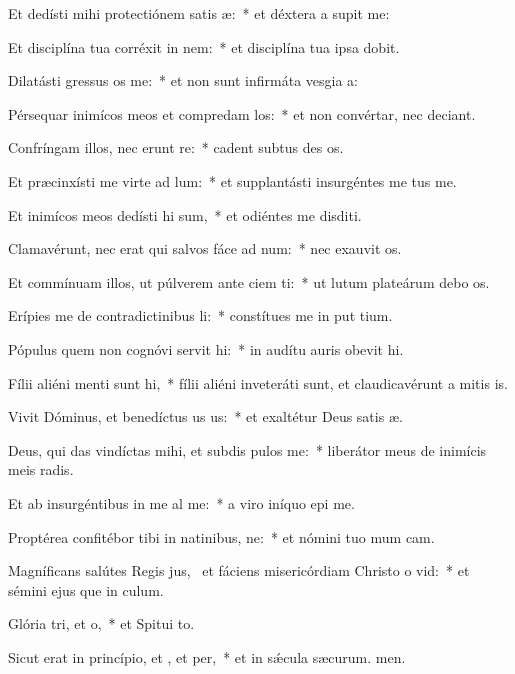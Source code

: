 \item Et dedísti mihi protectiónem satis æ:~* et déxtera a supit me:
\item Et disciplína tua corréxit  in nem:~* et disciplína tua ipsa  dobit.
\item Dilatásti gressus os  me:~* et non sunt infirmáta vesgia a:
\item Pérsequar inimícos meos et compredam los:~* et non convértar, nec deciant.
\item Confríngam illos, nec erunt re:~* cadent subtus des os.
\item Et præcinxísti me virte ad lum:~* et supplantásti insurgéntes  me tus me.
\item Et inimícos meos dedísti hi sum,~* et odiéntes me disditi.
\item Clamavérunt, nec erat qui salvos fáce ad num:~* nec exauvit os.
\item Et commínuam illos, ut púlverem ante ciem ti:~* ut lutum plateárum debo os.
\item Erípies me de contradictinibus li:~* constítues me in put tium.
\item Pópulus quem non cognóvi servit hi:~* in audítu auris obevit hi.
\item Fílii aliéni menti sunt hi,~* fílii aliéni inveteráti sunt, et claudicavérunt a mitis is.
\item Vivit Dóminus, et benedíctus us us:~* et exaltétur Deus satis æ.
\item Deus, qui das vindíctas mihi, et subdis pulos  me:~* liberátor meus de inimícis meis radis.
\item Et ab insurgéntibus in me al me:~* a viro iníquo epi me.
\item Proptérea confitébor tibi in natinibus, ne:~* et nómini tuo mum cam.
\item Magníficans salútes Regis jus,~\pscross{} et fáciens misericórdiam Christo o vid:~* et sémini ejus que in culum.
\item Glória tri, et o,~* et Spitui to.
\item Sicut erat in princípio, et , et per,~* et in sǽcula sæcurum. men.
